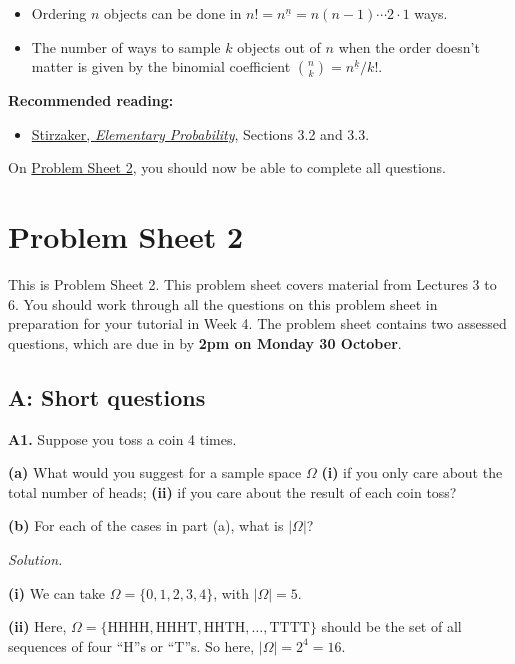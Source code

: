 \documentclass[
  a4paper,
]{book}
\providecommand{\tightlist}{%
  \setlength{\itemsep}{0pt}\setlength{\parskip}{0pt}}
\newif\ifcomm\commtrue
\theoremstyle{definition}
\theoremstyle{definition}
\theoremstyle{definition}
\theoremstyle{definition}
\theoremstyle{remark}
\begin{document}
\begin{itemize}
\tightlist
\item
  Ordering \(n\) objects can be done in \(n! = n^{\underline{n}} = n(n-1)\cdots2\cdot1\) ways.
\item
  The number of ways to sample \(k\) objects out of \(n\) when the order doesn't matter is given by the binomial coefficient \(\binom nk = {n}^{\underline{k}}/k!\).
\end{itemize}

\textbf{Recommended reading:}

\begin{itemize}
\tightlist
\item
  \href{https://leeds.primo.exlibrisgroup.com/permalink/44LEE_INST/13rlbcs/alma991013131349705181}{Stirzaker, \emph{Elementary Probability}}, Sections 3.2 and 3.3.
\end{itemize}

On \protect\hyperlink{P2}{Problem Sheet 2}, you should now be able to complete all questions.

\hypertarget{P2}{%
\chapter*{Problem Sheet 2}\label{P2}}

\commfalse

This is Problem Sheet 2. This problem sheet covers material from Lectures 3 to 6. You should work through all the questions on this problem sheet in preparation for your tutorial in Week 4. The problem sheet contains two assessed questions, which are due in by \textbf{2pm on Monday 30 October}.

\hypertarget{P2-short}{%
\section*{A: Short questions}\label{P2-short}}

\textbf{A1.} Suppose you toss a coin 4 times.

\textbf{(a)} What would you suggest for a sample space \(\Omega\) \textbf{(i)} if you only care about the total number of heads; \textbf{(ii)} if you care about the result of each coin toss?

\textbf{(b)} For each of the cases in part (a), what is \(|\Omega|\)?

\begin{myanswers}
\emph{Solution.}

\textbf{(i)} We can take \(\Omega = \{0,1,2,3,4\}\), with \(|\Omega| = 5\).

\textbf{(ii)} Here, \(\Omega = \{ \text{HHHH}, \text{HHHT}, \text{HHTH},\dots, \text{TTTT} \}\) should be the set of all sequences of four ``H''s or ``T''s. So here, \(|\Omega| = 2^4 = 16\).

\end{myanswers}
\end{document}

